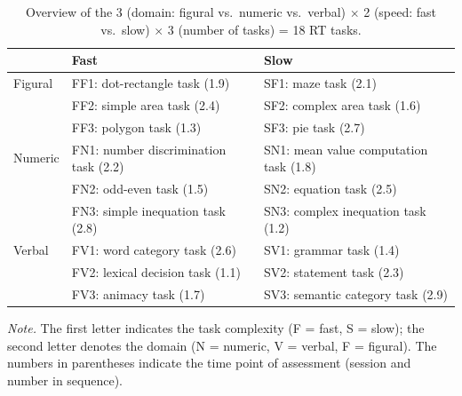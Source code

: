 \begin{table}[ht]
\centering
\caption{Overview of the 3 (domain: figural vs.\ numeric vs.\ verbal) $\times$ 2 (speed: fast vs.\ slow) $\times$ 3 (number of tasks) = 18 RT tasks.}
\label{tab:tasks}
\begin{tabular}{lll}
\toprule
 & \textbf{Fast} & \textbf{Slow} \\
\midrule
Figural & FF1: dot-rectangle task (1.9) & SF1: maze task (2.1) \\
        & FF2: simple area task (2.4) & SF2: complex area task (1.6) \\
        & FF3: polygon task (1.3) & SF3: pie task (2.7) \\
\addlinespace
Numeric & FN1: number discrimination task (2.2) & SN1: mean value computation task (1.8) \\
        & FN2: odd-even task (1.5) & SN2: equation task (2.5) \\
        & FN3: simple inequation task (2.8) & SN3: complex inequation task (1.2) \\
\addlinespace
Verbal  & FV1: word category task (2.6) & SV1: grammar task (1.4) \\
        & FV2: lexical decision task (1.1) & SV2: statement task (2.3) \\
        & FV3: animacy task (1.7) & SV3: semantic category task (2.9) \\
\bottomrule
\end{tabular}

\smallskip
\noindent\textit{Note.} The first letter indicates the task complexity (F = fast, S = slow); the second letter denotes the domain (N = numeric, V = verbal, F = figural). The numbers in parentheses indicate the time point of assessment (session and number in sequence).
\end{table}
